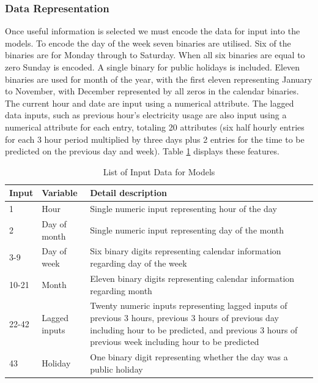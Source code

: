 \subsubsection{Data Representation}

Once useful information is selected we must encode the data for input into the models. To encode the day of the week seven binaries are utilised. Six of the binaries are for Monday through to Saturday. When all six binaries are equal to zero Sunday is encoded. A single binary for public holidays is included. Eleven binaries are used for month of the year, with the first eleven representing January to November, with December represented by all zeros in the calendar binaries. The current hour and date are input using a numerical attribute. The lagged data inputs, such as previous hour's electricity usage are also input using a numerical attribute for each entry, totaling 20 attributes (six half hourly entries for each 3 hour period multiplied by three days plus 2 entries for the time to be predicted on the previous day and week). Table \ref{tab:feature} displays these features.


\begin{table}
	\caption{List of Input Data for Models}
	\label{tab:feature}
	\begin{tabular}{p{3cm}p{3cm}p{8cm}}
		\toprule
		Input & Variable      & Detail description \\
		\midrule
		1     & Hour          & Single numeric input representing hour of the day                                                                                              \\
		2     & Day of month  & Single numeric input representing day of the month                                                                                             \\
		3-9   & Day of week   & Six binary digits representing calendar information regarding day of the week                                                                                            \\
		10-21 & Month         & Eleven binary digits representing calendar information regarding month                                                                                         \\
		22-42 & Lagged inputs & Twenty numeric inputs representing lagged inputs of previous 3 hours, previous 3 hours of previous day including hour to be predicted, and previous 3 hours of previous week including hour to be predicted \\
		43    & Holiday       & One binary digit representing whether the day was a public holiday  \\     \bottomrule                                                           
	\end{tabular}
\end{table}


